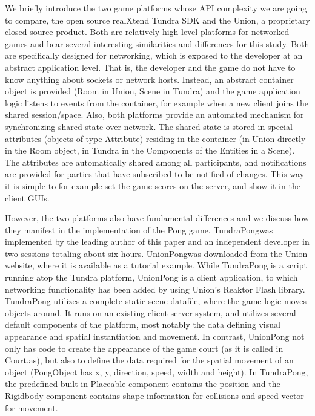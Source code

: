 \documentclass[conference]{IEEEtran}
\begin{document}
We briefly introduce the two game platforms whose API complexity we are
going to compare, the open source realXtend Tundra SDK
\cite{Alatalo2011} and the Union, a proprietary closed source
product\footnotemark[1]. Both are relatively high-level platforms for
networked games and bear several interesting similarities and
differences for this study. Both are specifically designed for
networking, which is exposed to the developer at an abstract
application level. That is, the developer and the game do not have to
know anything about sockets or network hosts. Instead, an abstract
container object is provided (Room in Union, Scene in Tundra) and the
game application logic listens to events from the container, for
example when a new client joins the shared session/space. Also, both
platforms provide an automated mechanism for synchronizing shared
state over network. The shared state is stored in special attributes
(objects of type Attribute) residing in the container (in Union
directly in the Room object, in Tundra in the Components of the
Entities in a Scene). The attributes are automatically shared among
all participants, and notifications are provided for parties that have
subscribed to be notified of changes. This way it is simple to for
example set the game scores on the server, and show it in the client
GUIs.


However, the two platforms also have fundamental differences and we
discuss how they manifest in the implementation of the Pong
game. TundraPong\footnotemark[2] was implemented by the leading author
of this paper and an independent developer in two sessions totaling
about six hours. UnionPong\footnotemark[3] was downloaded from the
Union website, where it is available as a tutorial example. While
TundraPong is a script running atop the Tundra platform, UnionPong is
a client application, to which networking functionality has been added
by using Union’s Reaktor Flash library. TundraPong utilizes a complete
static scene datafile, where the game logic moves objects around. It
runs on an existing client-server system, and utilizes several default
components of the platform, most notably the data defining visual
appearance and spatial instantiation and movement. In contrast,
UnionPong not only has code to create the appearance of the game court
(as it is called in Court.as), but also to define the data required for
the spatial movement of an object (PongObject has x, y, direction,
speed, width and height). In TundraPong, the predefined built-in
Placeable component contains the position and the Rigidbody component
contains shape information for collisions and speed vector for
movement.
\end{document}

